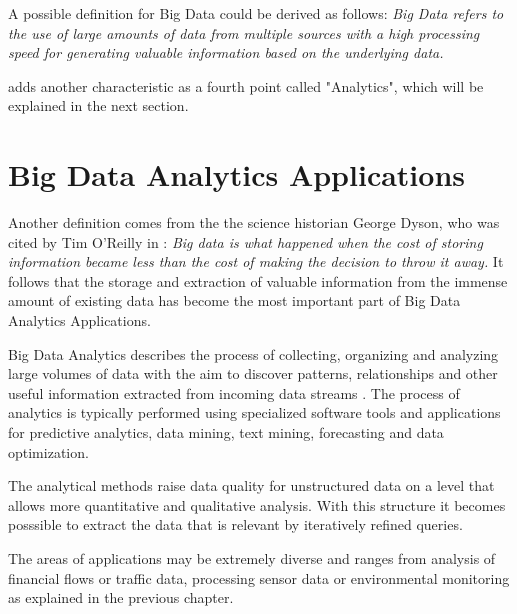 A possible definition for Big Data could be derived as follows: \textit{Big Data refers to the use of
large amounts of data from multiple sources with a high processing speed for generating valuable information
based on the underlying data.}

\cite{Bitk12} adds another characteristic as a fourth point called "Analytics", which will be explained in the
next section.

\section{Big Data Analytics Applications}

Another definition comes from the the science historian George Dyson, who was cited by Tim O'Reilly in \cite{Dys13}:
\textit{Big data is what happened when the cost of storing information became less than the cost of making the
decision to throw it away.} It follows that the storage and extraction of valuable information from the immense amount of
existing data has become the most important part of Big Data Analytics Applications.

Big Data Analytics describes the process of collecting, organizing and analyzing large volumes
of data with the aim to discover patterns, relationships and other useful information extracted from incoming
data streams \cite{Marz15}. The process of analytics is typically performed using specialized software tools and
applications for predictive analytics, data mining, text mining, forecasting and data optimization.

The analytical methods raise data quality for unstructured data on a level that allows more quantitative and
qualitative analysis. With this structure it becomes posssible to extract the data that is relevant by iteratively
refined queries.

The areas of applications may be extremely diverse and ranges from analysis of financial flows or traffic data,
processing sensor data or environmental monitoring as explained in the previous chapter.


